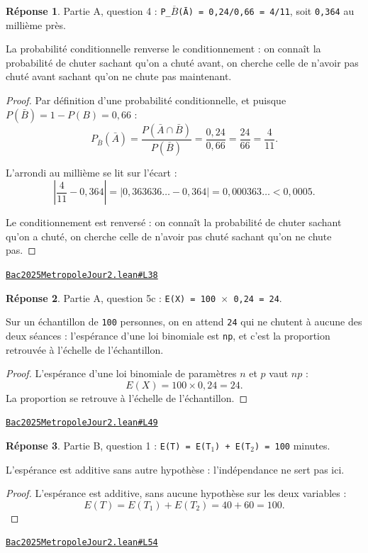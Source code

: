 \documentclass[11pt,a4paper]{article}
\theoremstyle{definition}
\theoremstyle{plain}
\theoremstyle{definition}
\newtheorem*{reponse}{Réponse}
\newcommand{\source}[2]{\par\smallskip\noindent\hfill{\footnotesize\href{#1}{\texttt{#2}}}\par\smallskip}
\begin{document}
\begin{reponse}
Partie A, question 4 : \texttt{P\_\(\overline{B}\)(Ā) = 0,24/0,66 = 4/11}, soit \texttt{0,364} au millième près.

La probabilité conditionnelle renverse le conditionnement : on connaît la probabilité
de chuter sachant qu'on a chuté avant, on cherche celle de n'avoir pas chuté avant
sachant qu'on ne chute pas maintenant.
\end{reponse}
\begin{proof}
Par définition d'une probabilité conditionnelle, et puisque
$P(\bar{B}) = 1 - P(B) = 0{,}66$ :
\[ P_{\bar{B}}(\bar{A}) = \frac{P(\bar{A} \cap \bar{B})}{P(\bar{B})}
   = \frac{0{,}24}{0{,}66} = \frac{24}{66} = \frac{4}{11} . \]

L'arrondi au millième se lit sur l'écart :
\[ \left|\frac{4}{11} - 0{,}364\right| = |0{,}363636\ldots - 0{,}364|
   = 0{,}000363\ldots < 0{,}0005 . \]

Le conditionnement est renversé : on connaît la probabilité de chuter sachant qu'on a
chuté, on cherche celle de n'avoir pas chuté sachant qu'on ne chute pas.
\end{proof}
\source{https://github.com/Commutator-IO/learn-lean/blob/main/exams/2025/Bac2025MetropoleJour2.lean\#L38}{Bac2025MetropoleJour2.lean\#L38}

\begin{reponse}
Partie A, question 5c : \texttt{E(X) = 100 \(\times\) 0,24 = 24}.

Sur un échantillon de \texttt{100} personnes, on en attend \texttt{24} qui ne chutent à aucune des
deux séances : l'espérance d'une loi binomiale est \texttt{np}, et c'est la proportion
retrouvée à l'échelle de l'échantillon.
\end{reponse}
\begin{proof}
L'espérance d'une loi binomiale de paramètres $n$ et $p$ vaut $np$ :
\[ E(X) = 100 \times 0{,}24 = 24 . \]
La proportion se retrouve à l'échelle de l'échantillon.
\end{proof}
\source{https://github.com/Commutator-IO/learn-lean/blob/main/exams/2025/Bac2025MetropoleJour2.lean\#L49}{Bac2025MetropoleJour2.lean\#L49}

\begin{reponse}
Partie B, question 1 : \texttt{E(T) = E(T\(_{1}\)) + E(T\(_{2}\)) = 100} minutes.

L'espérance est additive sans autre hypothèse : l'indépendance ne sert pas ici.
\end{reponse}
\begin{proof}
L'espérance est additive, sans aucune hypothèse sur les deux variables :
\[ E(T) = E(T_1) + E(T_2) = 40 + 60 = 100 . \]
\end{proof}
\source{https://github.com/Commutator-IO/learn-lean/blob/main/exams/2025/Bac2025MetropoleJour2.lean\#L54}{Bac2025MetropoleJour2.lean\#L54}
\end{document}

